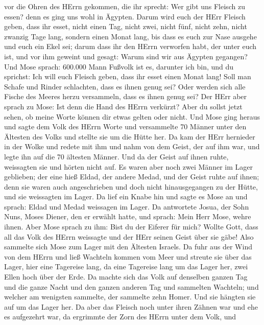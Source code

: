vor die Ohren des HErrn gekommen, die ihr sprecht: Wer gibt uns Fleisch
zu essen? denn es ging uns wohl in Ägypten. Darum wird euch der HErr
Fleisch geben, dass ihr esset,  nicht einen Tag, nicht
zwei, nicht fünf, nicht zehn, nicht zwanzig Tage lang, 
sondern einen Monat lang, bis dass es euch zur Nase ausgehe und euch ein
Ekel sei; darum dass ihr den HErrn verworfen habt, der unter euch ist,
und vor ihm geweint und gesagt: Warum sind wir aus Ägypten gegangen?
 Und Mose sprach: 600.000 Mann Fußvolk ist es, darunter ich
bin, und du sprichst: Ich will euch Fleisch geben, dass ihr esset einen
Monat lang!  Soll man Schafe und Rinder schlachten, dass es
ihnen genug sei? Oder werden sich alle Fische des Meeres herzu
versammeln, dass es ihnen genug sei?  Der HErr aber sprach
zu Mose: Ist denn die Hand des HErrn verkürzt? Aber du sollst jetzt
sehen, ob meine Worte können dir etwas gelten oder nicht. 
Und Mose ging heraus und sagte dem Volk des HErrn Worte und versammelte
70 Männer unter den Ältesten des Volks und stellte sie um die Hütte her.
 Da kam der HErr hernieder in der Wolke und redete mit ihm
und nahm von dem Geist, der auf ihm war, und legte ihn auf die 70
ältesten Männer. Und da der Geist auf ihnen ruhte, weissagten sie und
hörten nicht auf.  Es waren aber noch zwei Männer im Lager
geblieben; der eine hieß Eldad, der andere Medad, und der Geist ruhte
auf ihnen; denn sie waren auch angeschrieben und doch nicht
hinausgegangen zu der Hütte, und sie weissagten im Lager. 
Da lief ein Knabe hin und sagte es Mose an und sprach: Eldad und Medad
weissagen im Lager.  Da antwortete Josua, der Sohn Nuns,
Moses Diener, den er erwählt hatte, und sprach: Mein Herr Mose, wehre
ihnen.  Aber Mose sprach zu ihm: Bist du der Eiferer für
mich? Wollte Gott, dass all das Volk des HErrn weissagte und der HErr
seinen Geist über sie gäbe!  Also sammelte sich Mose zum
Lager mit den Ältesten Israels.  Da fuhr aus der Wind von
dem HErrn und ließ Wachteln kommen vom Meer und streute sie über das
Lager, hier eine Tagereise lang, da eine Tagereise lang um das Lager
her, zwei Ellen hoch über der Erde.  Da machte sich das
Volk auf denselben ganzen Tag und die ganze Nacht und den ganzen anderen
Tag und sammelten Wachteln; und welcher am wenigsten sammelte, der
sammelte zehn Homer. Und sie hängten sie auf um das Lager her.
 Da aber das Fleisch noch unter ihren Zähnen war und ehe es
aufgezehrt war, da ergrimmte der Zorn des HErrn unter dem Volk, und
